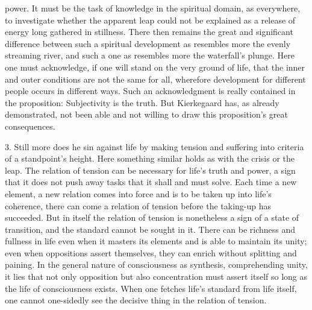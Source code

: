 \documentclass[12pt,a4paper]{book}
\newcommand{\opage}[1]{\marginnote{\footnotesize\textit{[#1]}}}
\begin{document}
power. It must be the task of knowledge in the spiritual domain, as
everywhere, to investigate whether the apparent leap could not be
explained as a release of energy long gathered in stillness. There then
remains the great and significant difference between such a spiritual
development as resembles more the evenly streaming river, and such a
one as resembles more the waterfall's plunge. Here one must acknowledge,
if one will stand on the very ground of life, that the inner and outer
conditions are not the same for all, wherefore development for
different people occurs in different ways. Such an acknowledgment is
really contained in the proposition: Subjectivity is the truth. But
Kierkegaard has, as already demonstrated, not been able and not willing
to draw this proposition's great consequences.

3. Still more does he sin against life by making tension and suffering
into criteria of a standpoint's height. Here something similar holds as
with the crisis or the leap. The relation of tension can be necessary
for life's truth and power, a sign that it does not push away tasks that
it shall and must solve. Each time a new element, a new relation comes
into force and is to be taken up into life's coherence, there can come a
relation of tension before the taking-up has succeeded. But in itself
the relation of tension is nonetheless a sign of a state of transition,
and the standard cannot be sought in it. There can be richness and
fullness in life even when it masters its elements and is able to
maintain its unity; even when
\opage{123}oppositions assert themselves, they can enrich without
splitting and paining. In the general nature of consciousness as
synthesis, comprehending unity, it lies that not only opposition but
also concentration must assert itself so long as the life of
consciousness exists. When one fetches life's standard from life itself,
one cannot one-sidedly see the decisive thing in the relation of
tension.
\end{document}
